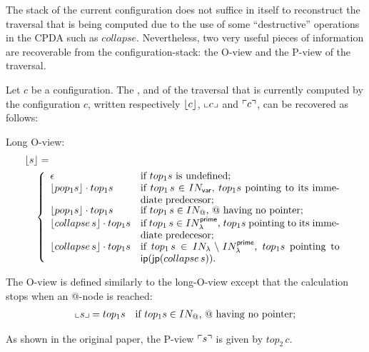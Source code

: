 \documentclass[a4paper,draft]{article}[12pt]
\theoremstyle{remark}
\theoremstyle{definition}
\newcommand\INodes{IN}%
\begin{document}
The stack of the current configuration does not suffice in itself to reconstruct the traversal that is being computed
due to the use of some ``destructive'' operations in the CPDA such as $collapse$. Nevertheless, two very useful pieces of information are recoverable from the configuration-stack: the O-view and the P-view of the traversal.

Let $c$ be a configuration. The ,
 and  of the traversal that is currently computed by the configuration $c$, written respectively $\lfloor c \rfloor$, $\llcorner c \lrcorner$ and $\ulcorner c \urcorner$, can be recovered as follows:
\begin{compactitem}
\item Long O-view:
\begin{align*}
&  \longoview{s} = \\
 & \quad \left\{
  \begin{array}{ll}
      \epsilon & \mbox{if $top_1 s$ is undefined;} \\
      \longoview{pop_1 s} \cdot top_1 s & \parbox[t]{7cm}{if $top_1\,s \in \INodes_{\sf var}$, $top_1 s$ pointing to its immediate predecesor;} \\
      \longoview{pop_1 s} \cdot top_1 s & \mbox{if $top_1\,s \in \INodes_@$, $@$ having no pointer;} \\
      \longoview{collapse\,s} \cdot top_1 s & \parbox[t]{7cm}{if $top_1\,s \in \INodes_\lambda^{\sf prime}$, $top_1 s$ pointing to its immediate predecesor;} \\
      \longoview{collapse\,s} \cdot top_1 s & \parbox[t]{7cm}{if $top_1\,s \in \INodes_\lambda\setminus \INodes_\lambda^{\sf prime}$, $top_1 s$ pointing to $\ip(\jp(collapse\,s))$.}
    \end{array}
      \right.
\end{align*}
\item The O-view is defined similarly to the long-O-view except that the calculation stops when an @-node is reached:
\begin{align*}
  \oview{s}  &=   top_1 s & \mbox{if $top_1 s \in \INodes_@$, $@$ having no pointer;}
\end{align*}
\item As shown in the original paper, the P-view $\ulcorner s \urcorner$ is given by $top_2\,c$.
\end{compactitem}
\bigskip
\end{document}
